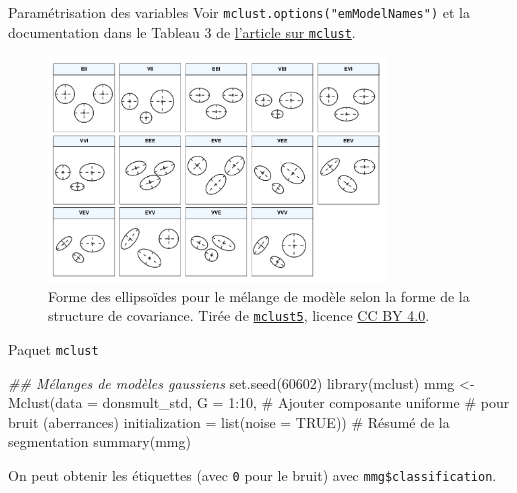 \documentclass[
  ignorenonframetext,
]{beamer}
\newenvironment{Shaded}{\begin{snugshade}}{\end{snugshade}}
\newcommand{\AttributeTok}[1]{\textcolor[rgb]{0.40,0.45,0.13}{#1}}
\newcommand{\CommentTok}[1]{\textcolor[rgb]{0.37,0.37,0.37}{#1}}
\newcommand{\ConstantTok}[1]{\textcolor[rgb]{0.56,0.35,0.01}{#1}}
\newcommand{\DecValTok}[1]{\textcolor[rgb]{0.68,0.00,0.00}{#1}}
\newcommand{\DocumentationTok}[1]{\textcolor[rgb]{0.37,0.37,0.37}{\textit{#1}}}
\newcommand{\FunctionTok}[1]{\textcolor[rgb]{0.28,0.35,0.67}{#1}}
\newcommand{\NormalTok}[1]{\textcolor[rgb]{0.00,0.23,0.31}{#1}}
\newcommand{\OtherTok}[1]{\textcolor[rgb]{0.00,0.23,0.31}{#1}}
\newcommand{\SpecialCharTok}[1]{\textcolor[rgb]{0.37,0.37,0.37}{#1}}
\begin{document}
\begin{frame}[fragile]{Paramétrisation des variables}
\protect\hypertarget{paramuxe9trisation-des-variables}{}
Voir \texttt{mclust.options("emModelNames")} et la documentation dans le
Tableau 3 de
\href{https://journal.r-project.org/archive/2016/RJ-2016-021/RJ-2016-021.pdf}{l'article
sur \texttt{mclust}}.

\begin{figure}

{\centering \includegraphics[width=0.8\textwidth,height=\textheight]{figures/mclust5-parametrization.png}

}

\caption{\label{fig-modeles}Forme des ellipsoïdes pour le mélange de
modèle selon la forme de la structure de covariance. Tirée de
\href{(https://journal.r-project.org/archive/2016/RJ-2016-021/RJ-2016-021.pdf)}{\texttt{mclust5}},
licence \href{https://creativecommons.org/licenses/by/4.0/}{CC BY 4.0}.}

\end{figure}
\end{frame}

\begin{frame}[fragile]{Paquet \texttt{mclust}}
\protect\hypertarget{paquet-mclust}{}
\begin{Shaded}
\begin{Highlighting}[numbers=left,,]
\DocumentationTok{\#\# Mélanges de modèles gaussiens}
\FunctionTok{set.seed}\NormalTok{(}\DecValTok{60602}\NormalTok{)}
\FunctionTok{library}\NormalTok{(mclust)}
\NormalTok{mmg }\OtherTok{\textless{}{-}} \FunctionTok{Mclust}\NormalTok{(}\AttributeTok{data =}\NormalTok{ donsmult\_std,}
       \AttributeTok{G =} \DecValTok{1}\SpecialCharTok{:}\DecValTok{10}\NormalTok{,}
       \CommentTok{\# Ajouter composante uniforme}
       \CommentTok{\#  pour bruit (aberrances)}
       \AttributeTok{initialization =} \FunctionTok{list}\NormalTok{(}\AttributeTok{noise =} \ConstantTok{TRUE}\NormalTok{))}
\CommentTok{\# Résumé de la segmentation}
\FunctionTok{summary}\NormalTok{(mmg)}
\end{Highlighting}
\end{Shaded}

On peut obtenir les étiquettes (avec \texttt{0} pour le bruit) avec
\texttt{mmg\$classification}.
\end{frame}
\end{document}
